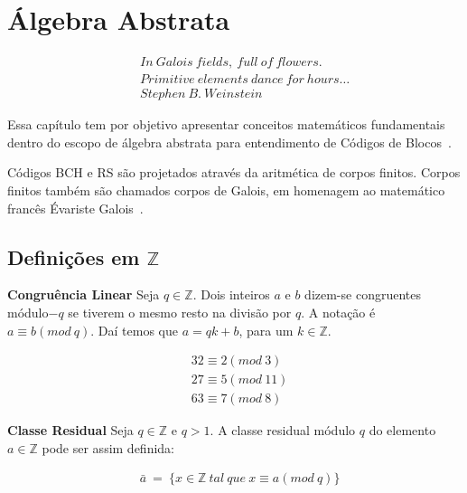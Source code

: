 \chapter{Álgebra Abstrata}



{\small
\begin{align*}
&& In\ Galois\ fields,\ full\ of\ flowers.\\
&& Primitive\ elements\ dance\ for\ hours \ldots\\
&& Stephen\ B.\ Weinstein
\end{align*}
}


Essa capítulo tem por objetivo apresentar conceitos matemáticos fundamentais
dentro do escopo de álgebra abstrata para entendimento de Códigos de Blocos~\cite{Hefez:2008}.

Códigos BCH e RS são projetados através da aritmética de corpos finitos. Corpos finitos
também são chamados corpos de Galois, em homenagem ao matemático francês Évariste Galois~\cite{Connell:2004}.

\section{Definições em $\mathbb{Z}$}

\begin{definition} {\bf Congruência Linear}  Seja $q \in \mathbb{Z}$. Dois inteiros $a$
 e $b$ dizem-se congruentes módulo$-q$ se tiverem o mesmo resto na divisão por
 $q$. A notação é $a \equiv b(mod\ q)$. Daí temos que $a = qk + b$, para um $k \in \mathbb{Z}$.
\end{definition}

\begin{example}
\begin{align*}
& 32 \equiv 2(mod\ 3)\\
& 27 \equiv 5(mod\ 11)\\
& 63 \equiv 7(mod\ 8)
\end{align*}
\end{example}


\begin{definition} {\bf Classe Residual}  Seja $q \in \mathbb{Z}$ e $q > 1$. A classe
residual módulo $q$ do elemento $a \in \mathbb{Z}$ pode ser assim definida:

\begin{align*}
& \bar{a}\ =\ \{ x \in \mathbb{Z}\ tal\ que\ x \equiv a(mod\ q)\}
\end{align*}

\end{definition}

